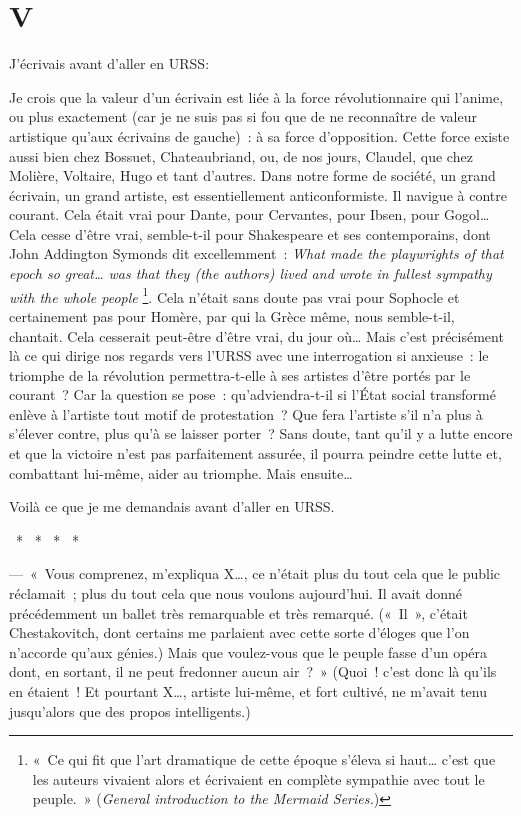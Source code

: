 \documentclass[french,twoside]{book} %
\newcommand\chapteropen{} %
\newcommand\chaptercont{} %
\begin{document}
\chapteropen

\chapter[{V}]{V}
\renewcommand{\leftmark}{V}


\chaptercont
J’écrivais avant d’aller en URSS:\par
Je crois que la valeur d’un écrivain est liée à la force révolutionnaire qui l’anime, ou plus exactement (car je ne suis pas si fou que de ne reconnaître de valeur artistique qu’aux écrivains de gauche) : à sa force d’opposition. Cette force existe aussi bien chez Bossuet, Chateaubriand, ou, de nos jours, Claudel, que chez Molière, Voltaire, Hugo et tant d’autres. Dans notre forme de société, un grand écrivain, un grand artiste, est essentiellement anticonformiste. Il navigue à contre courant. Cela était vrai pour Dante, pour Cervantes, pour Ibsen, pour Gogol… Cela cesse d’être vrai, semble-t-il pour Shakespeare et ses contemporains, dont John Addington Symonds dit excellemment : \emph{What made the playwrights of that epoch so great… was that they (the authors) lived and wrote in fullest sympathy with the whole people} \footnote{« Ce qui fit que l’art dramatique de cette époque s’éleva si haut… c’est que les auteurs vivaient alors et écrivaient en complète sympathie avec tout le peuple. » (\emph{General introduction to the Mermaid Series.})}. Cela n’était sans doute pas vrai pour Sophocle et certainement pas pour Homère, par qui la Grèce même, nous semble-t-il, chantait. Cela cesserait peut-être d’être vrai, du jour où… Mais c’est précisément là ce qui dirige nos regards vers l’URSS avec une interrogation si anxieuse : le triomphe de la révolution permettra-t-elle à ses artistes d’être portés par le courant ? Car la question se pose : qu’adviendra-t-il si l’État social transformé enlève à l’artiste tout motif de protestation ? Que fera l’artiste s’il n’a plus à s’élever contre, plus qu’à se laisser porter ? Sans doute, tant qu’il y a lutte encore et que la victoire n’est pas parfaitement assurée, il pourra peindre cette lutte et, combattant lui-même, aider au triomphe. Mais ensuite…\par
Voilà ce que je me demandais avant d’aller en URSS.\par
{\centering \noindent *  *  *  *  *\par}
— « Vous comprenez, m’expliqua X…, ce n’était plus du tout cela que le public réclamait ; plus du tout cela que nous voulons aujourd’hui. Il avait donné précédemment un ballet très remarquable et très remarqué. (« Il », c’était Chestakovitch, dont certains me parlaient avec cette sorte d’éloges que l’on n’accorde qu’aux génies.) Mais que voulez-vous que le peuple fasse d’un opéra dont, en sortant, il ne peut fredonner aucun air ? » (Quoi ! c’est donc là qu’ils en étaient ! Et pourtant X…, artiste lui-même, et fort cultivé, ne m’avait tenu jusqu’alors que des propos intelligents.)\par
\end{document}
